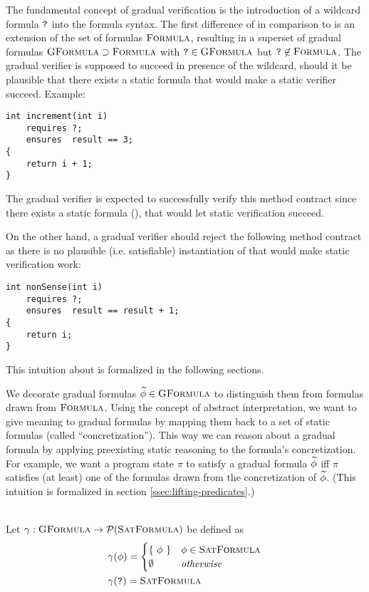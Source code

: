
The fundamental concept of gradual verification is the introduction of a wildcard formula $\textup{\texttt{?}}$ into the formula syntax.
The first difference of \gvl in comparison to \svl is an extension of the set of formulas $\textup{\textsc{Formula}}$, resulting in a superset of gradual formulas $\textup{\textsc{GFormula}} \supset \textup{\textsc{Formula}}$ with $\textup{\texttt{?}} \in \textup{\textsc{GFormula}}$ but $\textup{\texttt{?}} \not \in \textup{\textsc{Formula}}$.
The gradual verifier is supposed to succeed in presence of the wildcard, should it be plausible that there exists a static formula that would make a static verifier succeed.
Example:
\begin{lstlisting}
int increment(int i)
    requires ?;
    ensures  result == 3;
{
    return i + 1;
}
\end{lstlisting}
The gradual verifier is expected to successfully verify this method contract since there exists a static formula (), that would let static verification succeed.

On the other hand, a gradual verifier should reject the following method contract as there is no plausible (i.e. satisfiable) instantiation of \qm that would make static verification work:
\begin{lstlisting}
int nonSense(int i)
    requires ?;
    ensures  result == result + 1;
{
    return i;
}
\end{lstlisting}

This intuition about \qm is formalized in the following sections.

We decorate gradual formulas $\widetilde{\phi} \in \textup{\textsc{GFormula}}$ to distinguish them from formulas drawn from $\textup{\textsc{Formula}}$.
Using the concept of abstract interpretation, we want to give meaning to gradual formulas by mapping them back to a set of static formulas (called “concretization”).
This way we can reason about a gradual formula by applying preexisting static reasoning to the formula's concretization.
For example, we want a program state $\pi$ to satisfy a gradual formula $\widetilde{\phi}$ iff $\pi$ satisfies (at least) one of the formulas drawn from the concretization of $\widetilde{\phi}$.
(This intuition is formalized in section \ref{ssec:lifting-predicates}.)

\begin{definition}[Concretization]~\\
    Let $\gamma : \textup{\textsc{GFormula}} \rightarrow \mathcal{P}(\textup{\textsc{SatFormula}})$ be defined as
    \begin{align*}
    &\gamma(\phi) = 
        \begin{cases}
        \{~ \phi ~\}  & \phi \in \textup{\textsc{SatFormula}}\\
        \emptyset     & \textit{otherwise}
        \end{cases}\\
    &\gamma(\textup{\texttt{?}}) = \textup{\textsc{SatFormula}}
    \end{align*}
\end{definition}

